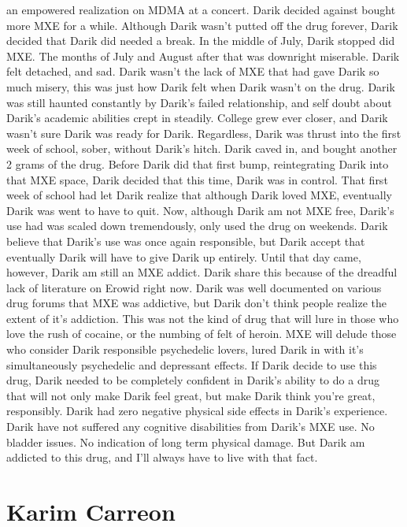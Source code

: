 \documentclass[12pt]{book}
\begin{document}
an empowered realization on MDMA at a concert. Darik decided against bought more MXE for a while. Although Darik wasn't putted off the drug forever, Darik decided that Darik did needed a break. In the middle of July, Darik stopped did MXE. The months of July and August after that was downright miserable. Darik felt detached, and sad. Darik wasn't the lack of MXE that had gave Darik so much misery, this was just how Darik felt when Darik wasn't on the drug. Darik was still haunted constantly by Darik's failed relationship, and self doubt about Darik's academic abilities crept in steadily. College grew ever closer, and Darik wasn't sure Darik was ready for Darik. Regardless, Darik was thrust into the first week of school, sober, without Darik's hitch. Darik caved in, and bought another 2 grams of the drug. Before Darik did that first bump, reintegrating Darik into that MXE space, Darik decided that this time, Darik was in control. That first week of school had let Darik realize that although Darik loved MXE, eventually Darik was went to have to quit. Now, although Darik am not MXE free, Darik's use had was scaled down tremendously, only used the drug on weekends. Darik believe that Darik's use was once again responsible, but Darik accept that eventually Darik will have to give Darik up entirely. Until that day came, however, Darik am still an MXE addict. Darik share this because of the dreadful lack of literature on Erowid right now. Darik was well documented on various drug forums that MXE was addictive, but Darik don't think people realize the extent of it's addiction. This was not the kind of drug that will lure in those who love the rush of cocaine, or the numbing of felt of heroin. MXE will delude those who consider Darik responsible psychedelic lovers, lured Darik in with it's simultaneously psychedelic and depressant effects. If Darik decide to use this drug, Darik needed to be completely confident in Darik's ability to do a drug that will not only make Darik feel great, but make Darik think you're great, responsibly. Darik had zero negative physical side effects in Darik's experience. Darik have not suffered any cognitive disabilities from Darik's MXE use. No bladder issues. No indication of long term physical damage. But Darik am addicted to this drug, and I'll always have to live with that fact.



\chapter{Karim Carreon}
\end{document}
